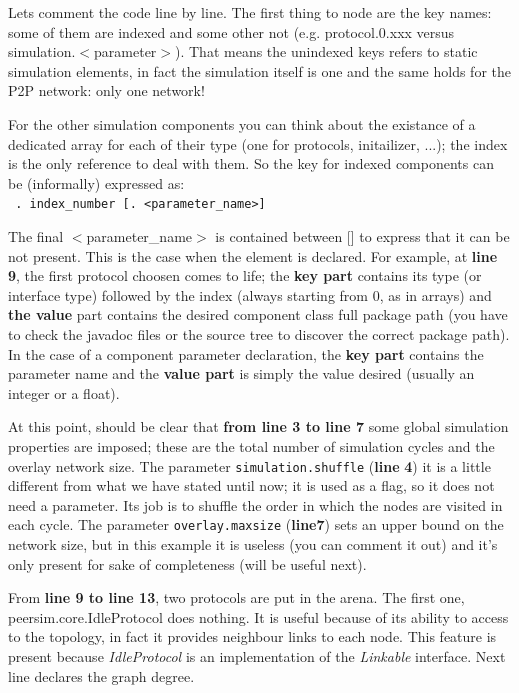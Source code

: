 \documentclass[a4paper,12pt]{article}
\begin{document}
Lets comment the code line by line. The first thing to node are the
key names: some of them are indexed and some other not (e.g. protocol.0.xxx
versus simulation.$<$parameter$>$). That means the unindexed keys refers
to static simulation elements, in fact the simulation itself is one
and the same holds for the P2P network: only one network! 

For the other simulation components you can think about the existance
of a dedicated array for each of their type (one for protocols, initailizer,
...); the \textsf{index} is the only reference to deal with them.
So the key for indexed components can be (informally) expressed as:
\\


\texttt{ . index\_number
{[}. <parameter\_name>{]}}~\\
{\footnotesize \par}

The final $<$parameter\_name$>$ is contained between {[}{]} to express
that it can be not present. This is the case when the element is declared.
For example, at \textbf{line 9}, the first protocol choosen comes to life;
the \textbf{key part} contains its type (or interface type) followed
by the index (always starting from 0, as in arrays) and \textbf{the
value} part contains the desired component class full package path
(you have to check the javadoc files or the source tree to discover
the correct package path). In the case of a component parameter declaration,
the \textbf{key part} contains the parameter name and the \textbf{value
part} is simply the value desired (usually an integer or a float).

At this point, should be clear that \textbf{from line 3 to line 7}
some global simulation properties are imposed; these are the total
number of simulation cycles and the overlay network size. The parameter
\texttt{simulation.shuffle} (\textbf{line} \textbf{4}) it is a little
different from what we have stated until now; it is used as a flag,
so it does not need a parameter. Its job is to shuffle the order in
which the nodes are visited in each cycle. The parameter \texttt{overlay.maxsize}
(\textbf{line7}) sets an upper bound on the network size, but in this
example it is useless (you can comment it out) and it's only present
for sake of completeness (will be useful next). 

From \textbf{line 9 to line 13}, two protocols are put in the arena.
The first one, peersim.core.IdleProtocol does nothing. It is useful
because of its ability to access to the topology, in fact it provides
neighbour links to each node. This feature is present because \emph{IdleProtocol}
is an implementation of the \emph{Linkable} interface. Next line declares
the graph degree. 
\end{document}
